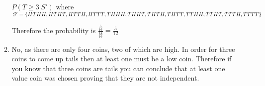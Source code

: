 \documentclass{article}
\begin{document}
\begin{enumerate}
\begin{enumerate}
                                $P(T\geq3|S')$ where $S'=\{HTHH,HTHT,HTTH,HTTT,THHH,\\THHT,THTH,THTT,TTHH,TTHT,TTTH,TTTT\}$

                                Therefore the probability is $\frac{\frac{5}{16}}{\frac{12}{16}}=\frac{5}{12}$
                        \item No, as there are only four coins, two of which are high. In order for three coins to come up tails then at least one must be a low coin. Therefore if you know that three coins are tails you can conclude that at least one value coin was chosen proving that they are not independent.
                \end{enumerate}
\end{enumerate}
\end{document}
